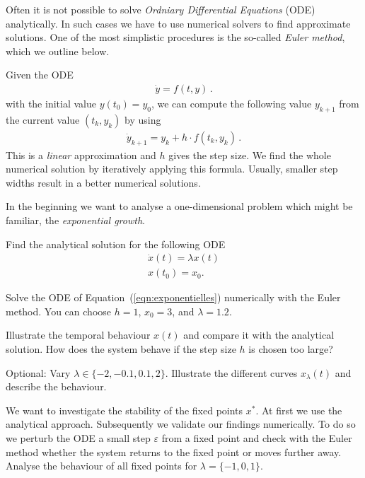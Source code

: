 
 \exercise[%
 topic = Numerical Solutions of Differential Equations
  ]

Often it is not possible to solve \emph{Ordniary Differential Equations}
(ODE) analytically. In such cases we have to use numerical solvers to
find approximate solutions. One of the most simplistic procedures is the
so-called \emph{Euler method}, which we outline below.

Given the ODE
\begin{align}
\dot y = f(t,y)\,.
\end{align}
with the initial value $y(t_0)=y_0$, we can compute the following value $y_{k+1}$ from the current value $(t_k,y_k)$ by using
\begin{align}
\dot y_{k+1} =y_k + h\cdot f(t_k,y_k)\,.
\end{align}
This is a \emph{linear} approximation and $h$ gives the step size. We
find the whole numerical solution by iteratively applying this formula.
Usually, smaller step widths result in a better numerical solutions. 


 \subexercise[%
  topic={Exponential Growth},
    ]


In the beginning we want to analyse a one-dimensional problem which might be familiar, the \emph{exponential growth}.
		
Find the analytical solution for the following ODE
\begin{align}
\dot x(t) = \lambda x(t)\\
x(t_0)=x_0.
\label{eqn:exponentielles}
\end{align}

\subexercise[%
  topic={One-Dimensional Euler Method},
    ]
    
Solve the ODE of Equation~(\ref{eqn:exponentielles}) numerically with the Euler method. You can choose  $h=1$, $x_0=3$, and $\lambda=1.2$.
    
Illustrate the temporal behaviour $x(t)$ and compare it with the analytical solution. How does the system behave if the step size $h$ is chosen too large?


Optional: Vary $\lambda \in \{-2,-0.1,0.1,2\}$. Illustrate the different curves $x_{\lambda}(t)$ and describe the behaviour.


\subexercise[%
  topic={Numerical Stability Analysis},
    ]


We want to investigate the stability of the fixed points $x^{*}$. At
first we use the analytical approach. Subsequently we validate our
findings numerically. To do so we perturb the ODE a small step $\varepsilon$ from a fixed point and check with the Euler method whether the system returns to the fixed point or moves further away. Analyse the behaviour of all fixed points for $\lambda = \{-1,0,1\}$.
    

